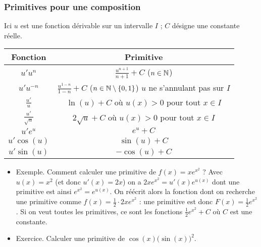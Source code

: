 \documentclass[11pt,class=report,crop=false]{standalone}
\begin{document}
\subsubsection*{Primitives pour une composition}

Ici $u$ est une fonction dérivable sur un intervalle $I$ ; $C$ désigne une constante réelle.

\begin{center}
	\begin{tabular}[t]{|c|c@{\vrule depth 1.2ex height 3ex width 0mm \ }|}
		\hline
		\textbf{Fonction}         & \textbf{Primitive} \\ \hline
		$u'u^n$         & $\frac{u^{n+1}}{n+1}+C$  \quad ($n \in \mathbb{N}$)   \\ \hline
		$u'u^{-n}$         & $\frac{u^{1-n}}{1-n}+C$  \quad ($n \in \mathbb{N}\setminus\{0,1\}$)   \quad $u$ ne s'annulant pas sur $I$  \\ \hline
		$\frac{u'}{u}$    & $\ln(u)+C$  où $u(x)>0$ pour tout $x \in I$       \\ \hline
		$\frac{u'}{\sqrt{u}}$    & $2\sqrt{u}+C$  \quad où $u(x)>0$ pour tout $x \in I$ \\ \hline
		$u'e^u$         & $e^u+C$                     \\ \hline
		$u'\cos(u)$      & $\sin(u)+C$                      \\ \hline
		$u'\sin(u)$      & $-\cos(u)+C$                        \\ \hline
	\end{tabular}
\end{center}


\begin{itemize}
   \item Exemple.
   Comment calculer une primitive de  $f(x) = x e^{x^2}$ ? 
   Avec $u(x) = x^2$ (et donc $u'(x)=2x$) on a 
   $2x e^{x^2}  = u'(x)e^{u(x)}$ dont une primitive est ainsi $e^{x^2} = e^{u(x)}$. On réécrit alors la fonction dont on recherche une primitive comme $f(x) = \frac 12 \cdot 2x e^{x^2}$ : une primitive est donc $F(x) = \frac 12 e^{x^2}$. 
   Si on veut toutes les primitives, ce sont les fonctions $\frac12 e^{x^2}+C$ où $C$ est une constante.

   \item Exercice. Calculer une primitive de $\cos(x) \big(\sin(x)\big)^2$.

\end{itemize}
\end{document}
